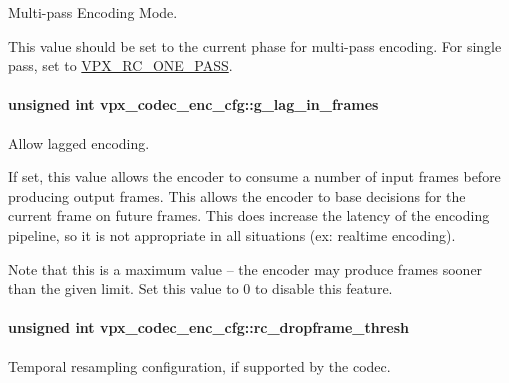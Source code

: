 Multi-\/pass Encoding Mode. 

This value should be set to the current phase for multi-\/pass encoding. For single pass, set to \hyperlink{group__encoder_gga476c5417f9c15a1dc5d3f68fa44c493fa7b6943a41868e8e26a77e9500f139ca1}{V\+P\+X\+\_\+\+R\+C\+\_\+\+O\+N\+E\+\_\+\+P\+A\+SS}. 
\paragraph[{\texorpdfstring{g\+\_\+lag\+\_\+in\+\_\+frames}{g_lag_in_frames}}]{\setlength{\rightskip}{0pt plus 5cm}unsigned int vpx\+\_\+codec\+\_\+enc\+\_\+cfg\+::g\+\_\+lag\+\_\+in\+\_\+frames}\hypertarget{structvpx__codec__enc__cfg_a992668d9e30305f3f7ab2672ea31a890}{}\label{structvpx__codec__enc__cfg_a992668d9e30305f3f7ab2672ea31a890}


Allow lagged encoding. 

If set, this value allows the encoder to consume a number of input frames before producing output frames. This allows the encoder to base decisions for the current frame on future frames. This does increase the latency of the encoding pipeline, so it is not appropriate in all situations (ex\+: realtime encoding).

Note that this is a maximum value -- the encoder may produce frames sooner than the given limit. Set this value to 0 to disable this feature. 
\paragraph[{\texorpdfstring{rc\+\_\+dropframe\+\_\+thresh}{rc_dropframe_thresh}}]{\setlength{\rightskip}{0pt plus 5cm}unsigned int vpx\+\_\+codec\+\_\+enc\+\_\+cfg\+::rc\+\_\+dropframe\+\_\+thresh}\hypertarget{structvpx__codec__enc__cfg_a619269f9a6904de58c4790e6806a3905}{}\label{structvpx__codec__enc__cfg_a619269f9a6904de58c4790e6806a3905}


Temporal resampling configuration, if supported by the codec. 


